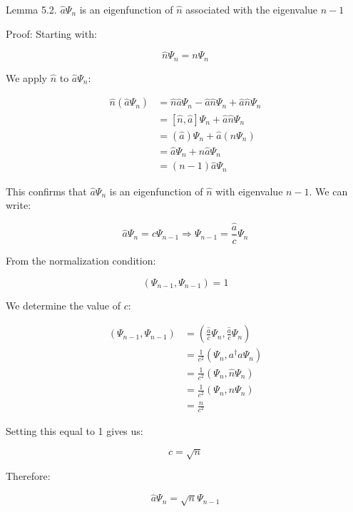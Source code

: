 \documentclass[italian]{HKNdocument}
\begin{document}
Lemma 5.2. $\hat{a}\Psi_n$ is an eigenfunction of $\hat{n}$ associated with the eigenvalue $n-1$

Proof:
Starting with:

\begin{equation}
\hat{n}\Psi_n = n\Psi_n
\end{equation}

We apply $\hat{n}$ to $\hat{a}\Psi_n$:

\begin{align}
\hat{n}(\hat{a}\Psi_n) &= \hat{n}\hat{a}\Psi_n - \hat{a}\hat{n}\Psi_n + \hat{a}\hat{n}\Psi_n \\
&= [\hat{n}, \hat{a}]\Psi_n + \hat{a}\hat{n}\Psi_n \\
&= (\hat{a})\Psi_n + \hat{a}(n\Psi_n)  \\
&= \hat{a}\Psi_n + n\hat{a}\Psi_n \\
&= (n-1)\hat{a}\Psi_n
\end{align}

This confirms that $\hat{a}\Psi_n$ is an eigenfunction of $\hat{n}$ with eigenvalue $n-1$. We can write:

\begin{equation}
\hat{a}\Psi_n = c\Psi_{n-1} \Longrightarrow \Psi_{n-1} = \frac{\hat{a}}{c}\Psi_n
\end{equation}

From the normalization condition:

\begin{equation}
(\Psi_{n-1}, \Psi_{n-1}) = 1
\end{equation}

We determine the value of $c$:

\begin{align}
(\Psi_{n-1}, \Psi_{n-1}) &= \left(\frac{\hat{a}}{c}\Psi_n, \frac{\hat{a}}{c}\Psi_n\right) \\
&= \frac{1}{c^2}(\Psi_n, a^\dagger a\Psi_n) \\
&= \frac{1}{c^2}(\Psi_n, \hat{n}\Psi_n)  \\
&= \frac{1}{c^2}(\Psi_n, n\Psi_n) \\
&= \frac{n}{c^2}
\end{align}

Setting this equal to 1 gives us:

\begin{equation}
c = \sqrt{n}
\end{equation}

Therefore:

\begin{equation}
\hat{a}\Psi_n = \sqrt{n}\Psi_{n-1}
\end{equation}
\end{document}
